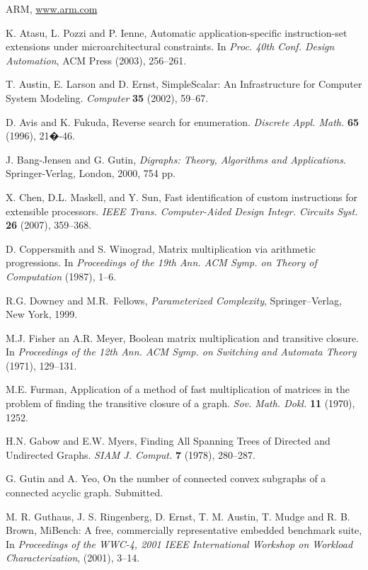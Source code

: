 \documentclass[11pt]{article}
\newcommand{\2}{\vspace{0.2 cm}}
\begin{document}
\begin{thebibliography}{99}
 ARM, \url{www.arm.com}



 K. Atasu, L. Pozzi and P. Ienne, Automatic
application-specific instruction-set extensions under
microarchitectural constraints. In {\em Proc. 40th Conf. Design
Automation}, ACM Press (2003), 256--261.

T. Austin, E. Larson and D. Ernst, SimpleScalar: An Infrastructure
for Computer System Modeling. {\em Computer} {\bf 35} (2002),
59--67.

 D. Avis and K. Fukuda, Reverse search for enumeration. {\em
Discrete
Appl. Math.} {\bf 65} (1996), 21�-46.

 J. Bang-Jensen and G. Gutin, {\em Digraphs: Theory, Algorithms
and Applications}. Springer-Verlag, London, 2000, 754 pp.


 X. Chen, D.L. Maskell, and Y. Sun,
Fast identification of custom instructions for extensible
processors. {\em IEEE Trans. Computer-Aided Design Integr. Circuits
Syst.} {\bf 26} (2007), 359--368.

 D. Coppersmith and S. Winograd, Matrix multiplication via arithmetic progressions. In {\em
Proceedings of the 19th Ann. ACM Symp. on Theory of Computation} (1987), 1--6.

 R.G. Downey and M.R.~Fellows,
{\em Parameterized Complexity\/}, Springer--Verlag, New York, 1999.

 M.J. Fisher an A.R. Meyer, 
Boolean matrix multiplication and transitive closure. In
{\em Proceedings of the 12th Ann. ACM Symp. on Switching and Automata Theory} (1971), 
129--131.

 M.E. Furman, 
Application of a method of fast multiplication
of matrices in the problem of finding the transitive closure of a graph.
{\em Sov. Math. Dokl.}
{\bf 11} (1970), 1252.

 H.N. Gabow and E.W. Myers, Finding All Spanning Trees of
Directed and Undirected Graphs. {\em SIAM J. Comput.} {\bf 7}
(1978), 280--287.

 G. Gutin and A. Yeo, On the number of connected convex subgraphs
of a connected acyclic graph. Submitted.

 M. R. Guthaus, J. S. Ringenberg, D. Ernst,
T. M. Austin, T. Mudge and R. B. Brown, MiBench: A free,
commercially representative embedded benchmark suite, In {\em
Proceedings of the WWC-4, 2001 IEEE International Workshop on
Workload Characterization}, (2001), 3--14.


\end{thebibliography}
\end{document}
